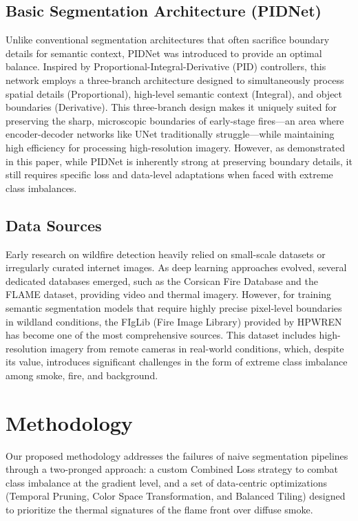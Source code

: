 \documentclass[conference]{IEEEtran}
\begin{document}
\subsection{Basic Segmentation Architecture (PIDNet)}
Unlike conventional segmentation architectures that often sacrifice boundary details for semantic context, PIDNet \cite{pidnet} was introduced to provide an optimal balance. Inspired by Proportional-Integral-Derivative (PID) controllers, this network employs a three-branch architecture designed to simultaneously process spatial details (Proportional), high-level semantic context (Integral), and object boundaries (Derivative). This three-branch design makes it uniquely suited for preserving the sharp, microscopic boundaries of early-stage fires---an area where encoder-decoder networks like UNet traditionally struggle---while maintaining high efficiency for processing high-resolution imagery. However, as demonstrated in this paper, while PIDNet is inherently strong at preserving boundary details, it still requires specific loss and data-level adaptations when faced with extreme class imbalances.

\subsection{Data Sources}
Early research on wildfire detection heavily relied on small-scale datasets or irregularly curated internet images. As deep learning approaches evolved, several dedicated databases emerged, such as the Corsican Fire Database and the FLAME dataset, providing video and thermal imagery. However, for training semantic segmentation models that require highly precise pixel-level boundaries in wildland conditions, the FIgLib (Fire Image Library) provided by HPWREN has become one of the most comprehensive sources. This dataset includes high-resolution imagery from remote cameras in real-world conditions, which, despite its value, introduces significant challenges in the form of extreme class imbalance among smoke, fire, and background.

\section{Methodology}
\label{sec:methodology}

Our proposed methodology addresses the failures of naive segmentation pipelines through a two-pronged approach: a custom Combined Loss strategy to combat class imbalance at the gradient level, and a set of data-centric optimizations (Temporal Pruning, Color Space Transformation, and Balanced Tiling) designed to prioritize the thermal signatures of the flame front over diffuse smoke.
\end{document}
